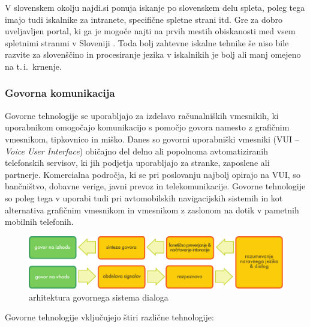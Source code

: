 \begin{multicols}{2}

V slovenskem okolju najdi.si ponuja iskanje po slovenskem delu spleta, poleg tega imajo tudi iskalnike za intranete, specifične spletne strani itd. Gre za dobro uveljav\-ljen portal, ki ga je mogoče najti na prvih mestih obiskanosti med vsem spletnimi stranmi v Sloveniji \cite{moss1}.  Toda bolj zah\-tevne iskalne tehnike še niso bile razvite za slovenščino in procesiranje jezika v iskalnikih je bolj ali manj omejeno na t.\,i.~krnenje.

\subsubsection{Govorna komunikacija}

Go\-vorne tehnologije se uporab\-ljajo za izdelavo računalniških vmesnikih, ki uporabnikom omogočajo komunikacijo s pomočjo go\-vora namesto z grafičnim vmesnikom, tipkovnico in miško. Danes so go\-vorni uporabniški vmesniki (VUI – \textit{Voice User Interface}) običajno del delno ali popolnoma avtomatiziranih telefonskih servisov, ki jih podjetja uporab\-ljajo za stranke, zaposlene ali partnerje. Komercialna področja, ki se pri poslovanju naj\-bolj opirajo na VUI, so bančništvo, dobavne verige, javni prevoz in telekomunikacije. Go\-vorne tehnologije so poleg tega v uporabi tudi pri avtomobilskih navigacij\-skih sistemih in kot alternativa grafičnim vmesnikom in vmesnikom z zaslonom na dotik v pametnih mobilnih telefonih.

\begin{figure}[htb]
  \center 
  \includegraphics[width=\textwidth]{../_media/slovene/simple_speech-based_dialogue_architecture}
  \caption{arhitektura govornega sistema dialoga}
  \label{fig:dialoguearch_de}
\end{figure}

Go\-vorne tehnologije vključujejo štiri različne tehnologije:


\end{multicols}
